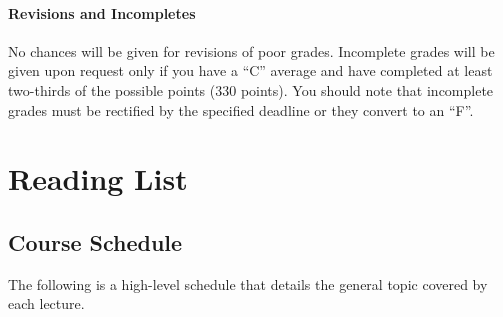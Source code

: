 \documentclass[]{book}
\begin{document}
\hypertarget{revisions-and-incompletes}{%
\subsection{Revisions and Incompletes}\label{revisions-and-incompletes}}

No chances will be given for revisions of poor grades. Incomplete grades will be given upon request only if you have a ``C'' average and have completed at least two-thirds of the possible points (330 points). You should note that incomplete grades must be rectified by the specified deadline or they convert to an ``F''.

\hypertarget{part-reading-list}{%
\part{Reading List}\label{part-reading-list}}

\hypertarget{course-schedule}{%
\chapter{Course Schedule}\label{course-schedule}}

The following is a high-level schedule that details the general topic covered by each lecture.
\end{document}
